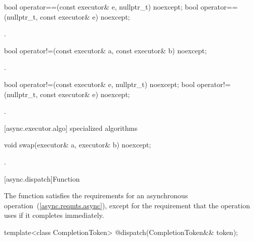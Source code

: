%
\begin{itemdecl}
bool operator==(const executor& e, nullptr_t) noexcept;
bool operator==(nullptr_t, const executor& e) noexcept;
\end{itemdecl}

\begin{itemdescr}
\pnum
\returns {}.
\end{itemdescr}

%
\begin{itemdecl}
bool operator!=(const executor& a, const executor& b) noexcept;
\end{itemdecl}

\begin{itemdescr}
\pnum
\returns {}.
\end{itemdescr}

%
\begin{itemdecl}
bool operator!=(const executor& e, nullptr_t) noexcept;
bool operator!=(nullptr_t, const executor& e) noexcept;
\end{itemdecl}

\begin{itemdescr}
\pnum
\returns {}.
\end{itemdescr}



[async.executor.algo]{ specialized algorithms}

%
\begin{itemdecl}
void swap(executor& a, executor& b) noexcept;
\end{itemdecl}

\begin{itemdescr}
\pnum
\effects {}.
\end{itemdescr}




[async.dispatch]{Function }

%
\pnum
\begin{note} The function  satisfies the requirements for an asynchronous operation~(\ref{async.reqmts.async}), except for the requirement that the operation uses  if it completes immediately. \end{note}

\begin{itemdecl}
template<class CompletionToken>
  @\DEDUCED@ dispatch(CompletionToken&& token);
\end{itemdecl}

